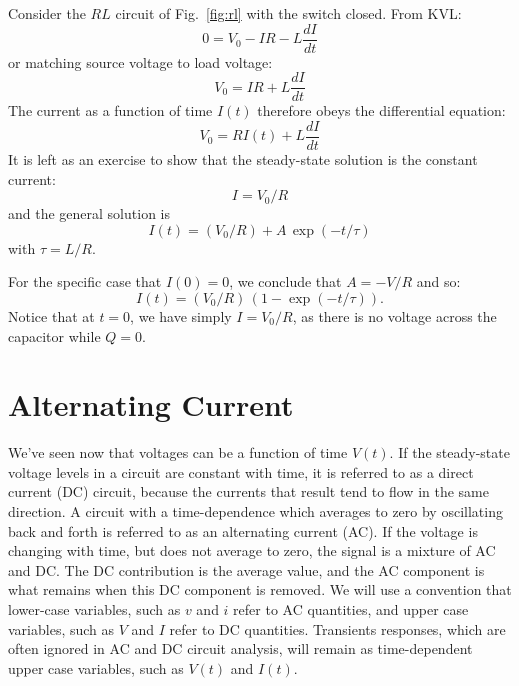 \documentclass[12pt,oneside]{book}
\begin{document}
Consider the $RL$ circuit of Fig.~\ref{fig:rl} with the switch closed.  From KVL:
\begin{displaymath}
0 = V_0 - IR - L\frac{dI}{dt}
\end{displaymath}
or matching source voltage to load voltage:
\begin{displaymath}
V_0 = IR + L\frac{dI}{dt}
\end{displaymath}
The current as a function of time $I(t)$ therefore obeys the differential equation:
\begin{equation} 
V_0 = R I(t) + L \frac{dI}{dt}
\end{equation}
It is left as an exercise to show that the steady-state solution is the constant current:
\begin{equation} \label{eqn:inductorss}
I = V_0 / R
\end{equation}
and the general solution is 
\begin{equation} \label{eqn:inductorgen}
I(t) = (V_0 / R) + A \, \exp(-t/\tau) 
\end{equation}
with $\tau = L / R$.

For the specific case that $I(0) = 0$, we conclude that $A = -V/R$ and so:
\begin{displaymath}
I(t) = (V_0/R) \, (1 - \exp(-t / \tau)).
\end{displaymath}
Notice that at $t=0$, we have simply $I = V_0/R$, as there is no voltage across the capacitor while $Q=0$.

\section{Alternating Current}
 
 We've seen now that voltages can be a function of time $V(t)$.    If the steady-state voltage levels in a circuit are constant with time, it is referred to as a direct current (DC) circuit, because the currents that result tend to flow in the same direction.   A circuit with a time-dependence which averages to zero by oscillating back and forth is referred to as an alternating current (AC).   If the voltage is changing with time, but does not average to zero, the signal is a mixture of AC and DC.  The DC contribution is the average value, and the AC component is what remains when this DC component is removed.  We will use a convention that lower-case variables, such as $v$ and $i$ refer to AC quantities, and upper case variables, such as $V$ and $I$ refer to DC quantities.  Transients responses, which are often ignored in AC and DC circuit analysis, will remain as time-dependent upper case variables, such as $V(t)$ and $I(t)$.
   
\end{document}
